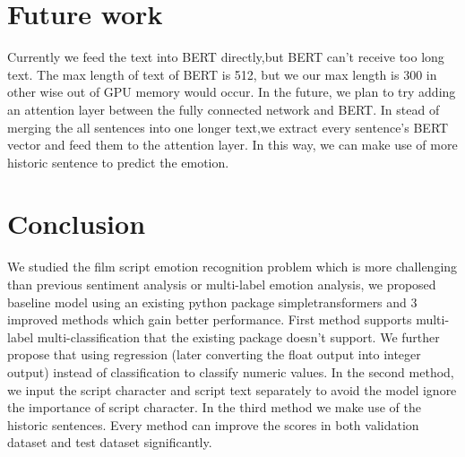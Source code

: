 \documentclass[12pt,twocolumn,letterpaper]{article}
\begin{document}

\section{Future work}
 Currently we feed the text into BERT directly,but BERT can't receive too long text. The max length of text of BERT is 512, but we our max length is 300 in other wise out of GPU memory would occur.  In the future, we plan to try adding an attention layer between the fully connected network and BERT. In stead of merging the all sentences into one longer text,we extract every sentence's BERT vector and feed them to the attention layer.  In this way, we can make use of more historic sentence to predict the emotion.

\section{Conclusion}
We studied the film script emotion recognition problem which is more challenging than previous sentiment analysis or multi-label emotion analysis, we proposed baseline model using an existing python package simpletransformers and 3 improved methods which gain better performance. First method supports multi-label multi-classification that the existing package doesn't support. We further propose that using regression (later converting the float output into integer output) instead of classification to classify numeric values. In the second method, we input the script character and script text separately to avoid the model ignore the importance of script character. In the third method we make use of the historic sentences. Every method can improve the scores in both validation dataset and test dataset significantly. 

   \makeatletter
    \renewcommand\@biblabel[1]{}
    \renewenvironment{thebibliography}[1]
    {\section*{\refname}%
    \@mkboth{\MakeUppercase\refname}{\MakeUppercase\refname}%
    \list{\@biblabel{\@arabic\c@enumiv}}%
    {\settowidth\labelwidth{\@biblabel{#1}}%
    \leftmargin\labelwidth
    \advance\leftmargin\labelsep
    \advance\leftmargin by 2em%
    \itemindent -2em%
    \@openbib@code
    \usecounter{enumiv}%
    \let\p@enumiv\@empty
    \renewcommand\theenumiv{\@arabic\c@enumiv}}%
    \sloppy
    \clubpenalty4000
    \@clubpenalty \clubpenalty
    \widowpenalty4000%
    \sfcode`\.\@m}
    {\def\@noitemerr
    {\@latex@warning{Empty `thebibliography' environment}}%
    \endlist}
    \makeatother
\end{document}
